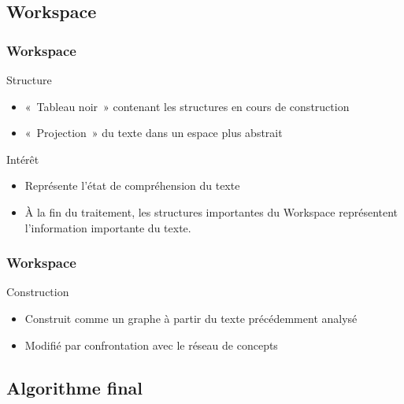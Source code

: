 \documentclass[12pt]{beamer}
\begin{document}
\subsection{Workspace}

\begin{frame}
  \frametitle{Workspace}

  \begin{block}{Structure}
    \begin{itemize}
      \item «~Tableau noir~» contenant les structures en cours de construction
      \item «~Projection~» du texte dans un espace plus abstrait
    \end{itemize}
  \end{block}
  
  \pause
  
  \begin{block}{Intérêt}
    \begin{itemize}
      \item Représente l'état de compréhension du texte
      \item À la fin du traitement, les structures importantes du Workspace représentent l'information importante du texte.
    \end{itemize}
  \end{block}

  
\end{frame}

\begin{frame}
  \frametitle{Workspace}
 
  \begin{block}{Construction}
    \begin{itemize}
      \item Construit comme un graphe à partir du texte précédemment analysé
      \item Modifié par confrontation avec le réseau de concepts
    \end{itemize}
  \end{block}
 
\end{frame}

\subsection{Algorithme final}
\end{document}
